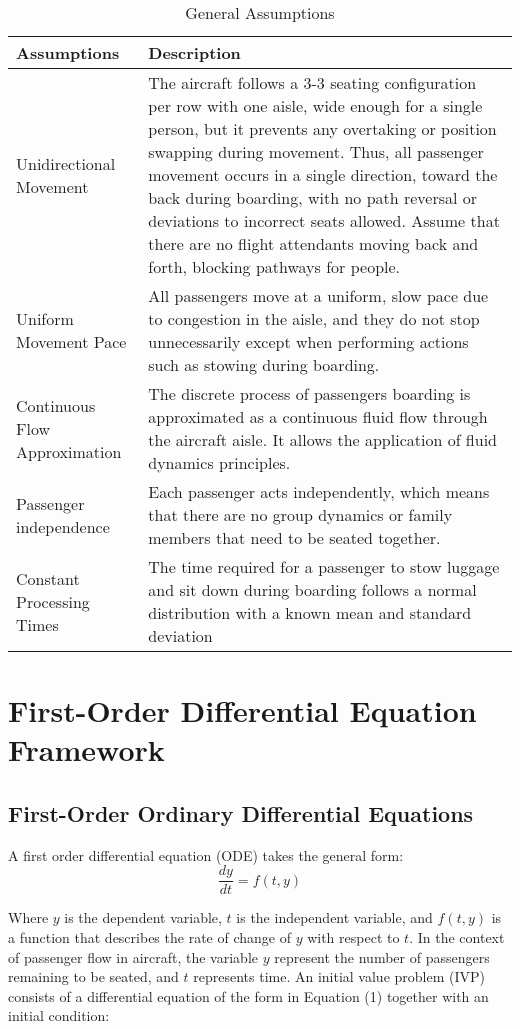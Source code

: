 \documentclass[12pt]{article}
\begin{document}
\begin{table}[H]
\centering
\caption{General Assumptions}
\begin{tabular}{p{3cm}p{12cm}}
\toprule
\textbf{Assumptions} & \textbf{Description} \\
\midrule
Unidirectional Movement & The aircraft follows a 3-3 seating configuration per row with one aisle, wide enough for a single person, but it prevents any overtaking or position swapping during movement. Thus, all passenger movement occurs in a single direction, toward the back during boarding, with no path reversal or deviations to incorrect seats allowed. Assume that there are no flight attendants moving back and forth, blocking pathways for people. \\
\midrule
Uniform Movement Pace & All passengers move at a uniform, slow pace due to congestion in the aisle, and they do not stop unnecessarily except when performing actions such as stowing during boarding. \\
\midrule
Continuous Flow Approximation & The discrete process of passengers boarding is approximated as a continuous fluid flow through the aircraft aisle. It allows the application of fluid dynamics principles. \\
\midrule
Passenger independence & Each passenger acts independently, which means that there are no group dynamics or family members that need to be seated together. \\
\midrule
Constant Processing Times & The time required for a passenger to stow luggage and sit down during boarding follows a normal distribution with a known mean and standard deviation \\
\bottomrule
\end{tabular}
\end{table}

\section{First-Order Differential Equation Framework}
\subsection{First-Order Ordinary Differential Equations}

A first order differential equation (ODE) takes the general form:
\begin{equation}
\frac{dy}{dt} = f(t, y)
\end{equation}

Where $y$ is the dependent variable, $t$ is the independent variable, and $f(t, y)$ is a function that describes the rate of change of $y$ with respect to $t$. In the context of passenger flow in aircraft, the variable $y$ represent the number of passengers remaining to be seated, and $t$ represents time. An initial value problem (IVP) consists of a differential equation of the form in Equation (1) together with an initial condition:
\end{document}
